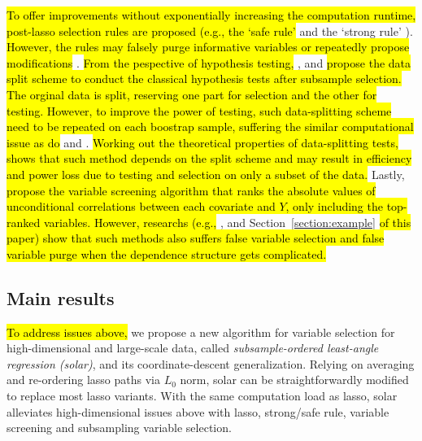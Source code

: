 \documentclass[12pt]{article}
\begin{document}
\hl{To offer improvements without exponentially increasing the computation runtime, post-lasso selection rules are proposed (e.g., the `safe rule'} \citep{ghaoui2010safe} and the `strong rule' \citep{tibshirani2012strong}). \hl{However, the rules may falsely purge informative variables or repeatedly propose modifications} \citep{wang2014safe, zeng2017efficient}. \hl{From the pespective of hypothesis testing,} \citet{wasserman2009high}, \citet{meinshausen2009p} and \citet{barber2019knockoff} \hl{propose the data split scheme to conduct the classical hypothesis tests after subsample selection. The orginal data is split, reserving one part for selection and the other for testing. However, to improve the power of testing, such data-splitting scheme need to be repeated on each boostrap sample, suffering the similar computational issue as do} \citet{bach2008bolasso} and \citet{meinshausen2010stability}. \hl{Working out the theoretical properties of data-splitting tests,} \citet{diciccio2020exact} \hl{shows that such method depends on the split scheme and may result in efficiency and power loss due to testing and selection on only a subset of the data.} Lastly, \citet{fan2008sure} \hl{propose the variable screening algorithm that ranks the absolute values of unconditional correlations between each covariate and $Y$, only including the top-ranked variables. However, researchs (e.g.,} \citet{fan2008sure}, \citet{barut2016conditional} and Section~\ref{section:example} \hl{of this paper) show that such methods also suffers false variable selection and false variable purge when the dependence structure gets complicated.}

\subsection{Main results}

\hl{To address issues above,} we propose a new algorithm for variable selection for high-dimensional and large-scale data, called \emph{subsample-ordered least-angle regression (solar)}, and its coordinate-descent generalization. Relying on averaging and re-ordering lasso paths via $L_0$ norm, solar can be straightforwardly modified to replace most lasso variants. With the same computation load as lasso, solar alleviates high-dimensional issues above with lasso, strong/safe rule, variable screening and subsampling variable selection. 
\end{document}

